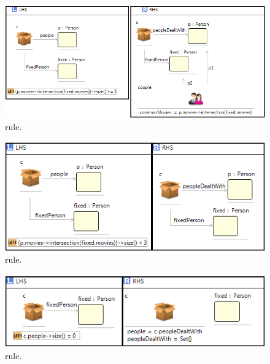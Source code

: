\begin{figure}[htp]
  \centering
  \includegraphics[width=\textwidth]{imgs/areCouple}
  \caption{ rule.}\label{fig:areCouple}
\end{figure}

\begin{figure}[htp]
  \centering
  \includegraphics[width=.8\textwidth]{imgs/areNotCouple}
  \caption{ rule.}\label{fig:areNotCouple}
\end{figure}

\begin{figure}[htp]
  \centering
  \includegraphics[width=.9\textwidth]{imgs/nextPerson}
  \caption{ rule.}\label{fig:nextPerson}
\end{figure}



